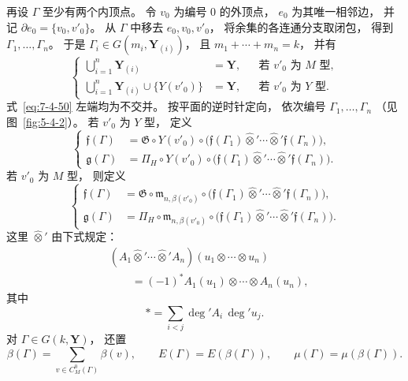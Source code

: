 再设 $\Gamma$ 至少有两个内顶点。
令 $v_0$ 为编号 $0$ 的外顶点，
$e_0$ 为其唯一相邻边，
并记
$\partial e_0=\{v_0,v'_0\}$。
从 $\Gamma$ 中移去
$e_0,v_0,v'_0$，
将余集的各连通分支取闭包，
得到 $\Gamma_1,\ldots,\Gamma_n$。
于是
$\Gamma_i\in G(m_i,\mathbf Y_{(i)})$，
且
$m_1+\cdots+m_n=k$，
并有
\begin{equation}
\left\{
\begin{aligned}
\bigcup_{i=1}^{n}\mathbf Y_{(i)}
&=\mathbf Y,
&&\text{若 $v'_0$ 为 $M$ 型},\\
\bigcup_{i=1}^{n}\mathbf Y_{(i)}
\cup\{Y(v'_0)\}
&=\mathbf Y,
&&\text{若 $v'_0$ 为 $Y$ 型}.
\end{aligned}
\right.
\tag{7.4.50}\label{eq:7-4-50}
\end{equation}
式~\eqref{eq:7-4-50}
左端均为不交并。
按平面的逆时针定向，
依次编号
$\Gamma_1,\ldots,\Gamma_n$
（见图~\ref{fig:5-4-2}）。
若 $v'_0$ 为 $Y$ 型，
定义
\begin{equation}
\left\{
\begin{aligned}
\mathfrak f(\Gamma)
&=\mathfrak G\circ Y(v'_0)\circ
\bigl(
\mathfrak f(\Gamma_1)
\widehat\otimes'\cdots\widehat\otimes'
\mathfrak f(\Gamma_n)
\bigr),\\
\mathfrak g(\Gamma)
&=\Pi_H\circ Y(v'_0)\circ
\bigl(
\mathfrak f(\Gamma_1)
\widehat\otimes'\cdots\widehat\otimes'
\mathfrak f(\Gamma_n)
\bigr).
\end{aligned}
\right.
\tag{7.4.51}\label{eq:7-4-51}
\end{equation}
若 $v'_0$ 为 $M$ 型，
则定义
\begin{equation}
\left\{
\begin{aligned}
\mathfrak f(\Gamma)
&=\mathfrak G\circ
\mathfrak m_{n,\beta(v'_0)}
\circ\bigl(
\mathfrak f(\Gamma_1)
\widehat\otimes'\cdots\widehat\otimes'
\mathfrak f(\Gamma_n)
\bigr),\\
\mathfrak g(\Gamma)
&=\Pi_H\circ
\mathfrak m_{n,\beta(v'_0)}
\circ\bigl(
\mathfrak f(\Gamma_1)
\widehat\otimes'\cdots\widehat\otimes'
\mathfrak f(\Gamma_n)
\bigr).
\end{aligned}
\right.
\tag{7.4.52}\label{eq:7-4-52}
\end{equation}
这里 $\widehat\otimes'$
由下式规定：
\begin{equation}
\begin{aligned}
&(A_1\widehat\otimes'\cdots
\widehat\otimes' A_n)
(u_1\otimes\cdots\otimes u_n)\\
&\qquad
=(-1)^\ast
A_1(u_1)\otimes\cdots\otimes A_n(u_n),
\end{aligned}
\tag{7.4.53}\label{eq:7-4-53}
\end{equation}
其中
\[
\ast=\sum_{i<j}
\deg' A_i\,\deg' u_j.
\]
对
$\Gamma\in G(k,\mathbf Y)$，
还置
\[
\beta(\Gamma)
=\sum_{v\in C^0_M(\Gamma)}\beta(v),
\qquad
E(\Gamma)=E(\beta(\Gamma)),
\qquad
\mu(\Gamma)=\mu(\beta(\Gamma)).
\]

